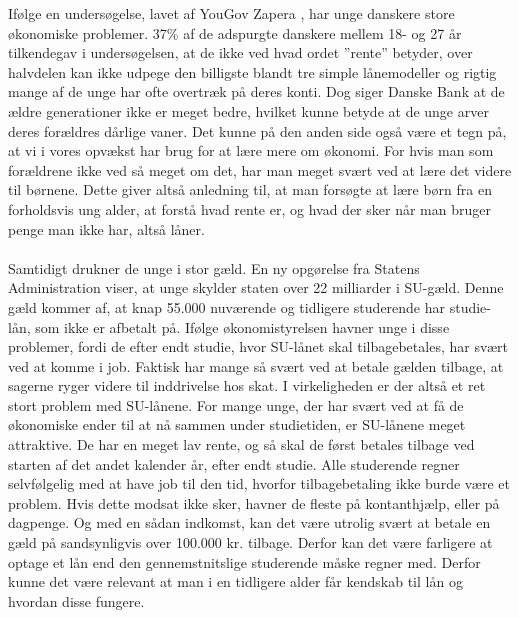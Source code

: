 
Ifølge en undersøgelse, lavet af YouGov Zapera \cite{DanskeB1}, har unge danskere store økonomiske problemer. 37\% af de adspurgte danskere mellem 18- og 27 år tilkendegav i undersøgelsen, at de ikke ved hvad ordet ”rente” betyder, over halvdelen kan ikke udpege den billigste blandt tre simple lånemodeller og rigtig mange af de unge har ofte overtræk på deres konti. Dog siger Danske Bank at de ældre generationer ikke er meget bedre, hvilket kunne betyde at de unge arver deres forældres dårlige vaner. Det kunne på den anden side også være et tegn på, at vi i vores opvækst har brug for at lære mere om økonomi. For hvis man som forældrene ikke ved så meget om det, har man meget svært ved at lære det videre til børnene. Dette giver altså anledning til, at man forsøgte at lære børn fra en forholdsvis ung alder, at forstå hvad rente er, og hvad der sker når man bruger penge man ikke har, altså låner.    \\
\\
Samtidigt drukner de unge i stor gæld. En ny opgørelse fra Statens Administration viser, at unge skylder staten over 22 milliarder i SU-gæld. Denne gæld kommer af, at knap 55.000 \cite{dr.dk} nuværende og tidligere studerende har studie-lån, som ikke er afbetalt på. Ifølge økonomistyrelsen havner unge i disse problemer, fordi de efter endt studie, hvor SU-lånet skal tilbagebetales, har svært ved at komme i job\cite{jobindex}. Faktisk har mange så svært ved at betale gælden tilbage, at sagerne ryger videre til inddrivelse hos skat\cite{BusinessDK1}. I virkeligheden er der altså et ret stort problem med SU-lånene. For mange unge, der har svært ved at få de økonomiske ender til at nå sammen under studietiden, er SU-lånene meget attraktive. De har en meget lav rente, og så skal de først betales tilbage ved starten af det andet kalender år, efter endt studie. Alle studerende regner selvfølgelig med at have job til den tid, hvorfor tilbagebetaling ikke burde være et problem. Hvis dette modsat ikke sker, havner de fleste på kontanthjælp, eller på dagpenge. Og med en sådan indkomst, kan det være utrolig svært at betale en gæld på sandsynligvis over 100.000 kr. tilbage. Derfor kan det være farligere at optage et lån end den gennemstnitslige studerende måske regner med. Derfor kunne det være relevant at man i en tidligere alder får kendskab til lån og hvordan disse fungere.  \\
\\
